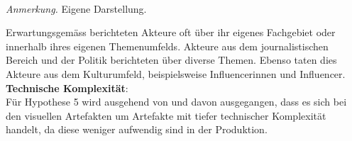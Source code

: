 \documentclass[12pt,a4paper]{article}        %
\begin{document}
\begin{table}
    \centering
\caption{\textit{Kreuztabelle zwischen Akteurrolle und Beitragsthema}}
\label{tab:results_role_topic_xtable}
     \\
    \footnotesize\textit{Anmerkung.} Eigene Darstellung.
\end{table}
Erwartungsgemäss berichteten Akteure oft über ihr eigenes Fachgebiet oder innerhalb ihres eigenen Themenumfelds. Akteure aus dem journalistischen Bereich und der Politik berichteten über diverse Themen. Ebenso taten dies Akteure aus dem Kulturumfeld, beispielsweise Influencerinnen und Influencer.\\

\textbf{Technische Komplexität}:\\
Für Hypothese 5 wird ausgehend von \textcite [15]{bradshaw_industrialized_2021} und \textcite[3698]{weikmann_visual_2023} davon ausgegangen, dass es sich bei den visuellen Artefakten um Artefakte mit tiefer technischer Komplexität handelt, da diese weniger aufwendig sind in der Produktion.
\end{document}
